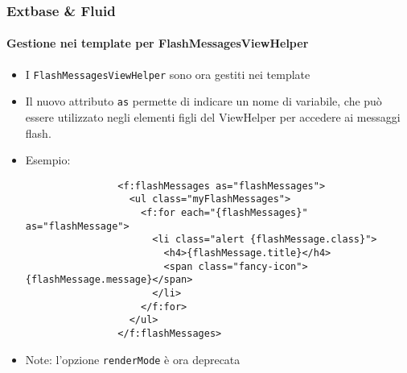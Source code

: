 
\begin{frame}[fragile]
	\frametitle{Extbase \& Fluid}
	\framesubtitle{Gestione nei template per FlashMessagesViewHelper}

	\lstset{basicstyle=\tiny\ttfamily}

	\begin{itemize}

		\item I \texttt{FlashMessagesViewHelper} sono ora gestiti nei template

		\item Il nuovo attributo \texttt{as} permette di indicare un nome di variabile, che può essere
			utilizzato negli elementi figli del ViewHelper per accedere ai messaggi flash.

		\item Esempio:

			\begin{lstlisting}
				<f:flashMessages as="flashMessages">
				  <ul class="myFlashMessages">
				    <f:for each="{flashMessages}" as="flashMessage">
				      <li class="alert {flashMessage.class}">
				        <h4>{flashMessage.title}</h4>
				        <span class="fancy-icon">{flashMessage.message}</span>
				      </li>
				    </f:for>
				  </ul>
				</f:flashMessages>
			\end{lstlisting}

		\item Note: l'opzione \texttt{renderMode} è ora deprecata

	\end{itemize}

\end{frame}


